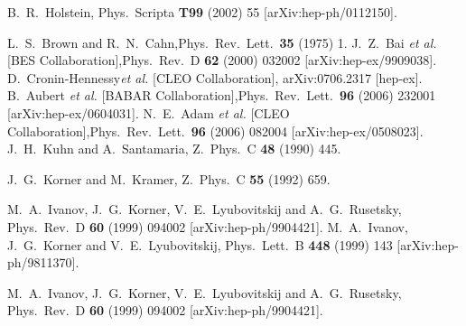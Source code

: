 \documentclass{article}
\begin{document}
\begin{thebibliography}{99}
 B.~R.~Holstein,
 Phys.\ Scripta {\bf T99} (2002) 55 [arXiv:hep-ph/0112150].

 L.~S.~Brown and R.~N.~Cahn,Phys.\ Rev.\ Lett.\  {\bf 35} (1975) 1.%
 J.~Z.~Bai {\it et al.}  [BES Collaboration],Phys.\ Rev.\  D {\bf 62} (2000) 032002 [arXiv:hep-ex/9909038].%
 D.~Cronin-Hennessy{\it et al.} [CLEO Collaboration], arXiv:0706.2317 [hep-ex].%
 B.~Aubert {\it et al.}  [BABAR Collaboration],Phys.\ Rev.\ Lett.\  {\bf 96} (2006) 232001 [arXiv:hep-ex/0604031].%
 N.~E.~Adam {\it et al.}  [CLEO Collaboration],Phys.\ Rev.\ Lett.\  {\bf 96} (2006) 082004 [arXiv:hep-ex/0508023].%
 J.~H.~Kuhn and A.~Santamaria,
Z.\ Phys.\  C {\bf 48} (1990) 445.

J.~G.~Korner and M.~Kramer,
Z.\ Phys.\  C {\bf 55} (1992) 659.

M.~A.~Ivanov, J.~G.~Korner, V.~E.~Lyubovitskij and A.~G.~Rusetsky,
Phys.\ Rev.\  D {\bf 60} (1999) 094002
[arXiv:hep-ph/9904421].
M.~A.~Ivanov, J.~G.~Korner and V.~E.~Lyubovitskij,
Phys.\ Lett.\  B {\bf 448} (1999) 143 [arXiv:hep-ph/9811370].

M.~A.~Ivanov, J.~G.~Korner, V.~E.~Lyubovitskij and A.~G.~Rusetsky,
Phys.\ Rev.\  D {\bf 60} (1999) 094002
[arXiv:hep-ph/9904421].

\end{thebibliography}
\end{document}
